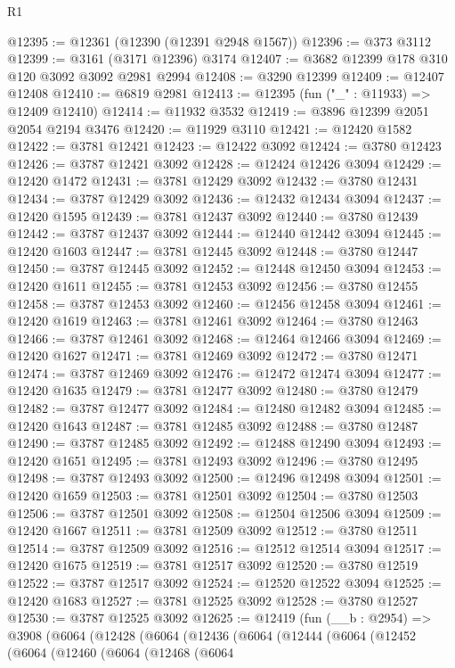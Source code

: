 \begin{lexlean}{R1}
\begin{coremodule}
@12395 := @12361 (@12390 (@12391 @2948 @1567))
@12396 := @373 @3112
@12399 := @3161 (@3171 @12396) @3174
@12407 := @3682 @12399 @178 @310 @120 @3092 @3092 @2981 @2994
@12408 := @3290 @12399
@12409 := @12407 @12408
@12410 := @6819 @2981
@12413 := @12395 (fun ("_" : @11933) => @12409 @12410)
@12414 := @11932 @3532
@12419 := @3896 @12399 @2051 @2054 @2194 @3476
@12420 := @11929 @3110
@12421 := @12420 @1582
@12422 := @3781 @12421
@12423 := @12422 @3092
@12424 := @3780 @12423
@12426 := @3787 @12421 @3092
@12428 := @12424 @12426 @3094
@12429 := @12420 @1472
@12431 := @3781 @12429 @3092
@12432 := @3780 @12431
@12434 := @3787 @12429 @3092
@12436 := @12432 @12434 @3094
@12437 := @12420 @1595
@12439 := @3781 @12437 @3092
@12440 := @3780 @12439
@12442 := @3787 @12437 @3092
@12444 := @12440 @12442 @3094
@12445 := @12420 @1603
@12447 := @3781 @12445 @3092
@12448 := @3780 @12447
@12450 := @3787 @12445 @3092
@12452 := @12448 @12450 @3094
@12453 := @12420 @1611
@12455 := @3781 @12453 @3092
@12456 := @3780 @12455
@12458 := @3787 @12453 @3092
@12460 := @12456 @12458 @3094
@12461 := @12420 @1619
@12463 := @3781 @12461 @3092
@12464 := @3780 @12463
@12466 := @3787 @12461 @3092
@12468 := @12464 @12466 @3094
@12469 := @12420 @1627
@12471 := @3781 @12469 @3092
@12472 := @3780 @12471
@12474 := @3787 @12469 @3092
@12476 := @12472 @12474 @3094
@12477 := @12420 @1635
@12479 := @3781 @12477 @3092
@12480 := @3780 @12479
@12482 := @3787 @12477 @3092
@12484 := @12480 @12482 @3094
@12485 := @12420 @1643
@12487 := @3781 @12485 @3092
@12488 := @3780 @12487
@12490 := @3787 @12485 @3092
@12492 := @12488 @12490 @3094
@12493 := @12420 @1651
@12495 := @3781 @12493 @3092
@12496 := @3780 @12495
@12498 := @3787 @12493 @3092
@12500 := @12496 @12498 @3094
@12501 := @12420 @1659
@12503 := @3781 @12501 @3092
@12504 := @3780 @12503
@12506 := @3787 @12501 @3092
@12508 := @12504 @12506 @3094
@12509 := @12420 @1667
@12511 := @3781 @12509 @3092
@12512 := @3780 @12511
@12514 := @3787 @12509 @3092
@12516 := @12512 @12514 @3094
@12517 := @12420 @1675
@12519 := @3781 @12517 @3092
@12520 := @3780 @12519
@12522 := @3787 @12517 @3092
@12524 := @12520 @12522 @3094
@12525 := @12420 @1683
@12527 := @3781 @12525 @3092
@12528 := @3780 @12527
@12530 := @3787 @12525 @3092
@12625 := @12419
    (fun (__b : @2954) =>
    @3908
      (@6064
        (@12428
          (@6064
            (@12436
              (@6064
                (@12444
                  (@6064
                    (@12452
                      (@6064
                        (@12460
                          (@6064
                            (@12468
                              (@6064

\end{coremodule}
\end{lexlean}
